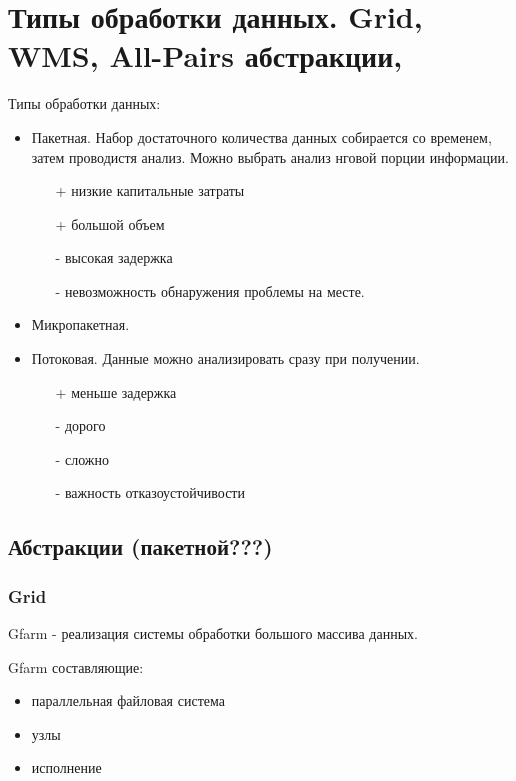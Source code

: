 \section{Типы обработки данных. Grid, WMS, All-Pairs абстракции,}

Типы обработки данных:
\begin{itemize}
    \item Пакетная.
    Набор достаточного количества данных собирается со временем, затем проводистя
    анализ. Можно выбрать анализ нговой порции информации.
    \begin{itemize}
        \item[+] низкие капитальные затраты
        \item[+] большой объем
        \item[-] высокая задержка
        \item[-] невозможность обнаружения проблемы на месте.
    \end{itemize}
    \item Микропакетная.
    \item Потоковая.
    Данные можно анализировать сразу при получении.
    \begin{itemize}
        \item[+] меньше задержка
        \item[-] дорого
        \item[-] сложно
        \item[-] важность отказоустойчивости
    \end{itemize}
\end{itemize}

\subsection*{Абстракции (пакетной???)}

\subsubsection*{Grid}

Gfarm - реализация системы обработки большого массива данных.

Gfarm составляющие:
\begin{itemize}
    \item параллельная файловая система
    \item узлы
    \item исполнение
\end{itemize}

